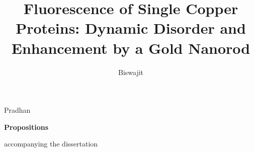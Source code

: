 \documentclass{dissertation}
\begin{document}
\title[]{Fluorescence of Single Copper Proteins: Dynamic Disorder and Enhancement by a Gold Nanorod}
\author{Biswajit}{Pradhan}

\begin{center}

{\Large\titlefont\bfseries Propositions}


accompanying the dissertation


{\makeatletter
\titlestyle\bfseries\large\@title
\makeatother}

{\makeatletter
\ifx\@subtitle\undefined\else
    \titlefont\titleshape\@subtitle
\fi
\makeatother}





\end{center}
\end{document}
